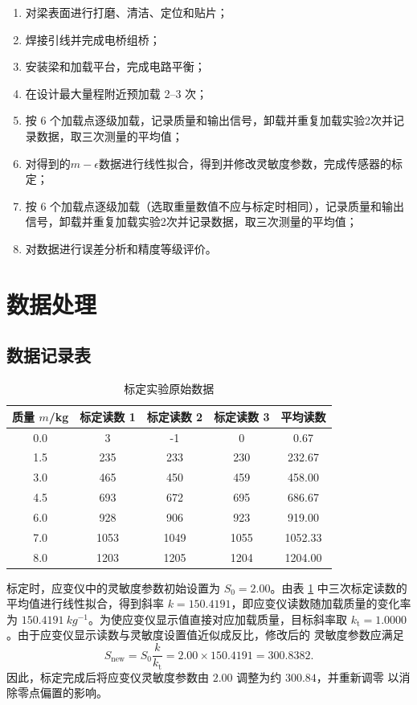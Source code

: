 \documentclass[UTF8,a4paper,zihao=5]{ctexart}
\begin{document}
\begin{enumerate}
  \item 对梁表面进行打磨、清洁、定位和贴片；
  \item 焊接引线并完成电桥组桥；
  \item 安装梁和加载平台，完成电路平衡；
  \item 在设计最大量程附近预加载 2--3 次；
  \item 按 6 个加载点逐级加载，记录质量和输出信号，卸载并重复加载实验2次并记录数据，取三次测量的平均值；
  \item 对得到的$m-\epsilon$数据进行线性拟合，得到并修改灵敏度参数，完成传感器的标定；
  \item 按 6 个加载点逐级加载（选取重量数值不应与标定时相同），记录质量和输出信号，卸载并重复加载实验2次并记录数据，取三次测量的平均值；
  \item 对数据进行误差分析和精度等级评价。
\end{enumerate}

\section{数据处理}

\subsection{数据记录表}

\begin{table}[H]
  \centering
  \begin{tabular}{ccccc}
    \toprule
    质量 \(m\)/kg & 标定读数 1 & 标定读数 2 & 标定读数 3 & 平均读数 \\
    \midrule
    0.0 & 3 & -1 & 0 & 0.67 \\
    1.5 & 235 & 233 & 230 & 232.67 \\
    3.0 & 465 & 450 & 459 & 458.00 \\
    4.5 & 693 & 672 & 695 & 686.67 \\
    6.0 & 928 & 906 & 923 & 919.00 \\
    7.0 & 1053 & 1049 & 1055 & 1052.33 \\
    8.0 & 1203 & 1205 & 1204 & 1204.00 \\
    \bottomrule
  \end{tabular}
  \caption{标定实验原始数据}
  \label{tab:calibration-raw-data}
\end{table}

标定时，应变仪中的灵敏度参数初始设置为 \(S_0=2.00\)。由表
\ref{tab:calibration-raw-data} 中三次标定读数的平均值进行线性拟合，得到斜率
\(k=150.4191\)，即应变仪读数随加载质量的变化率为
\(\SI{150.4191}{kg^{-1}}\)。为使应变仪显示值直接对应加载质量，目标斜率取
\(k_{\mathrm{t}}=1.0000\)。由于应变仪显示读数与灵敏度设置值近似成反比，修改后的
灵敏度参数应满足
\begin{equation}
  S_{\mathrm{new}}
  =S_0\frac{k}{k_{\mathrm{t}}}
  =2.00\times 150.4191
  =300.8382.
  \label{eq:instrument-sensitivity-setting}
\end{equation}
因此，标定完成后将应变仪灵敏度参数由 \(2.00\) 调整为约 \(300.84\)，并重新调零
以消除零点偏置的影响。
\end{document}

